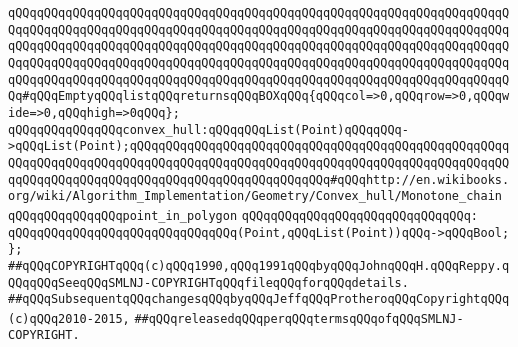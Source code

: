 \verb|qQQqqQQqqQQqqQQqqQQqqQQqqQQqqQQqqQQqqQQqqQQqqQQqqQQqqQQqqQQqqQQqqQQqqQQqqQQqqQQqqQQqqQQqqQQqqQQqqQQqqQQqqQQqqQQqqQQqqQQqqQQqqQQqqQQqqQQqqQQqqQQqqQQqqQQqqQQqqQQqqQQqqQQqqQQqqQQqqQQqqQQqqQQqqQQqqQQqqQQqqQQqqQQqqQQqqQQqqQQqqQQqqQQqqQQqqQQqqQQqqQQqqQQqqQQqqQQqqQQqqQQqqQQqqQQqqQQqqQQqqQQqqQQqqQQqqQQqqQQqqQQqqQQqqQQqqQQqqQQqqQQqqQQqqQQqqQQqqQQqqQQqqQQqqQQq#qQQqEmptyqQQqlistqQQqreturnsqQQqBOXqQQq{qQQqcol=>0,qQQqrow=>0,qQQqwide=>0,qQQqhigh=>0qQQq};|\newline
\newline
\verb|qQQqqQQqqQQqqQQqconvex_hull:qQQqqQQqList(Point)qQQqqQQq->qQQqList(Point);qQQqqQQqqQQqqQQqqQQqqQQqqQQqqQQqqQQqqQQqqQQqqQQqqQQqqQQqqQQqqQQqqQQqqQQqqQQqqQQqqQQqqQQqqQQqqQQqqQQqqQQqqQQqqQQqqQQqqQQqqQQqqQQqqQQqqQQqqQQqqQQqqQQqqQQqqQQqqQQqqQQqqQQq#qQQqhttp://en.wikibooks.org/wiki/Algorithm_Implementation/Geometry/Convex_hull/Monotone_chain|\newline
\newline
\verb|qQQqqQQqqQQqqQQqpoint_in_polygon|\newline
\verb|qQQqqQQqqQQqqQQqqQQqqQQqqQQqqQQq:|\newline
\verb|qQQqqQQqqQQqqQQqqQQqqQQqqQQqqQQq(Point,qQQqList(Point))qQQq->qQQqBool;|\newline
\newline
\verb|};|\newline
\newline
\newline
\verb|##qQQqCOPYRIGHTqQQq(c)qQQq1990,qQQq1991qQQqbyqQQqJohnqQQqH.qQQqReppy.qQQqqQQqSeeqQQqSMLNJ-COPYRIGHTqQQqfileqQQqforqQQqdetails.|\newline
\verb|##qQQqSubsequentqQQqchangesqQQqbyqQQqJeffqQQqProtheroqQQqCopyrightqQQq(c)qQQq2010-2015,|\newline
\verb|##qQQqreleasedqQQqperqQQqtermsqQQqofqQQqSMLNJ-COPYRIGHT.|\newline

